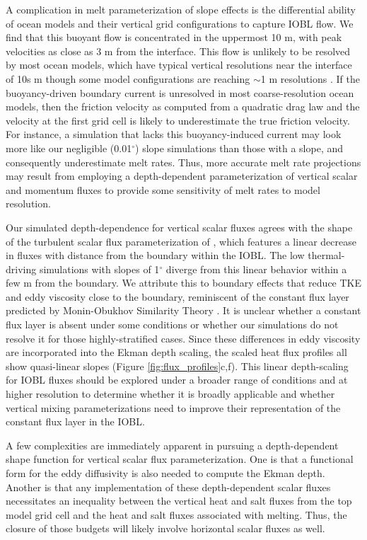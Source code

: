 \documentclass[draft]{styles/agujournal2019}
\begin{document}
A complication in melt parameterization of slope effects is the differential ability of ocean models and their vertical grid configurations to capture IOBL flow. We find that this buoyant flow is concentrated in the uppermost 10 m, with peak velocities as close as 3 m from the interface. This flow is unlikely to be resolved by most ocean models, which have typical vertical resolutions near the interface of 10s m though some model configurations are reaching $\sim\!$1 m resolutions \cite{gwyther_cold_2020}. If the buoyancy-driven boundary current is unresolved in most coarse-resolution ocean models, then the friction velocity as computed from a quadratic drag law and the velocity at the first grid cell is likely to underestimate the true friction velocity. For instance, a simulation that lacks this buoyancy-induced current may look more like our negligible (0.01$^{\circ}$) slope simulations than those with a slope, and consequently underestimate melt rates. Thus, more accurate melt rate projections may result from employing a depth-dependent parameterization of vertical scalar and momentum fluxes to provide some sensitivity of melt rates to model resolution. 

Our simulated depth-dependence for vertical scalar fluxes agrees with the shape of the turbulent scalar flux parameterization of , which features a linear decrease in fluxes with distance from the boundary within the IOBL. The low thermal-driving simulations with slopes of 1$^{\circ}$ diverge from this linear behavior within a few m from the boundary. We attribute this to boundary effects that reduce TKE and eddy viscosity close to the boundary, reminiscent of the constant flux layer predicted by Monin-Obukhov Similarity Theory \cite{monin_basic_1954}. It is unclear whether a constant flux layer is absent under some conditions or whether our simulations do not resolve it for those highly-stratified cases. Since these differences in eddy viscosity are incorporated into the Ekman depth scaling, the scaled heat flux profiles all show quasi-linear slopes (Figure \ref{fig:flux_profiles}c,f). This linear depth-scaling for IOBL fluxes should be explored under a broader range of conditions and at higher resolution to determine whether it is broadly applicable and whether vertical mixing parameterizations need to improve their representation of the constant flux layer in the IOBL. 

A few complexities are immediately apparent in pursuing a depth-dependent shape function for vertical scalar flux parameterization. One is that a functional form for the eddy diffusivity is also needed to compute the Ekman depth. Another is that any implementation of these depth-dependent scalar fluxes necessitates an inequality between the vertical heat and salt fluxes from the top model grid cell and the heat and salt fluxes associated with melting. Thus, the closure of those budgets will likely involve horizontal scalar fluxes as well.
\end{document}
